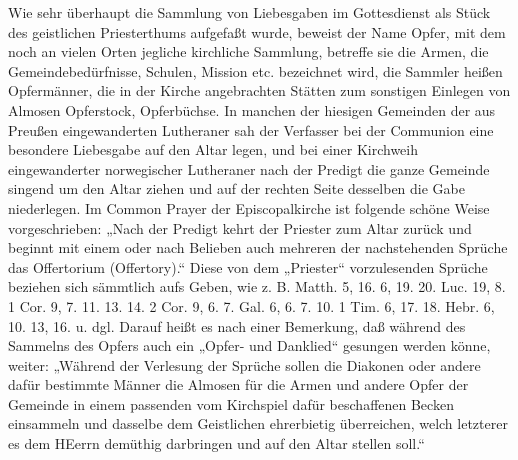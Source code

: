 Wie sehr überhaupt die Sammlung von Liebesgaben im Gottesdienst als Stück des geistlichen Priesterthums aufgefaßt wurde, beweist der Name Opfer, mit dem noch an vielen Orten jegliche kirchliche Sammlung, betreffe sie die Armen, die Gemeindebedürfnisse, Schulen, Mission etc. bezeichnet wird, die Sammler heißen Opfermänner, die in der Kirche angebrachten Stätten zum sonstigen Einlegen von Almosen Opferstock, Opferbüchse. In manchen der hiesigen Gemeinden der aus Preußen eingewanderten Lutheraner sah der Verfasser bei der Communion eine besondere Liebesgabe auf den Altar legen, und bei einer Kirchweih eingewanderter norwegischer Lutheraner nach der Predigt die ganze Gemeinde singend um den Altar ziehen und auf der rechten Seite desselben die Gabe niederlegen. Im Common Prayer der Episcopalkirche ist folgende schöne Weise vorgeschrieben: „Nach der Predigt kehrt der Priester zum Altar zurück und beginnt mit einem oder nach Belieben auch mehreren der nachstehenden Sprüche das Offertorium (Offertory).“ Diese von dem „Priester“ vorzulesenden Sprüche beziehen sich sämmtlich aufs Geben, wie z. B. Matth. 5, 16. 6, 19. 20. Luc. 19, 8. 1 Cor. 9, 7. 11. 13. 14. 2 Cor. 9, 6. 7. Gal. 6, 6. 7. 10. 1 Tim. 6, 17. 18. Hebr. 6, 10. 13, 16. u. dgl. Darauf heißt es nach einer Bemerkung, daß während des Sammelns des Opfers auch ein „Opfer- und Danklied“ gesungen werden könne, weiter: „Während der Verlesung der Sprüche sollen die Diakonen oder andere dafür bestimmte Männer die Almosen für die Armen und andere Opfer der Gemeinde in einem passenden vom Kirchspiel dafür beschaffenen Becken einsammeln und dasselbe dem Geistlichen ehrerbietig überreichen, welch letzterer es dem HEerrn demüthig darbringen und auf den Altar stellen soll.“

